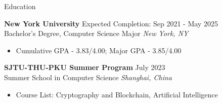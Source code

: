 \documentclass{cv} %
\begin{document}

\begin{rSection}{Education}

	\textbf{New York University} \hfill Expected Completion: Sep 2021 - May 2025\\
	Bachelor's Degree, Computer Science Major \hfill \textit{New York, NY}
	\begin{itemize}
		\item Cumulative GPA - 3.83/4.00; Major GPA - 3.85/4.00
	\end{itemize}

	\textbf{SJTU-THU-PKU Summer Program} \hfill July 2023\\
	Summer School in Computer Science \hfill \textit{Shanghai, China}
	\begin{itemize}
		\item Course List: Cryptography and Blockchain, Artificial Intelligence
	\end{itemize}

\end{rSection}

\end{document}
